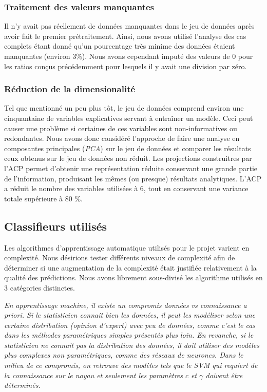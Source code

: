 \subsubsection{Traitement des valeurs manquantes}
Il n'y avait pas réellement de données manquantes dans le jeu de données après avoir fait le premier prétraitement. Ainsi, nous avons utilisé l'analyse des cas complets étant donné qu'un pourcentage très minime des données étaient manquantes (environ 3\%). Nous avons cependant imputé des valeurs de 0 pour les ratios conçus précédemment pour lesquels il y avait une division par zéro.

\subsubsection{Réduction de la dimensionalité}
Tel que mentionné un peu plus tôt, le jeu de données comprend environ une cinquantaine de variables explicatives servant à entraîner un modèle. Ceci peut causer une problème si certaines de ces variables sont non-informatives ou redondantes. Nous avons donc considéré l'approche de faire une analyse en composantes principales (\textit{PCA}) sur le jeu de données et comparer les résultats ceux obtenus sur le jeu de données non réduit. Les projections construitres par l'ACP permet d'obtenir une représentation réduite conservant une grande partie de l'information, produisant les mêmes (ou presque) résultats analytiques. L'ACP a réduit le nombre des variables utilisées à 6, tout en conservant une variance totale supérieure à 80 \%.

\subsection{Classifieurs utilisés}
Les algorithmes d'apprentissage automatique utilisés pour le projet varient en complexité. Nous désirions tester différents niveaux de complexité afin de déterminer si une augmentation de la complexité était justifiée relativement à la qualité des prédictions. Nous avons librement sous-divisé les algorithme utilisés en 3 catégories distinctes.

\textit{En apprentissage machine, il existe un compromis données vs connaissance a priori. Si le statisticien connait bien les données, il peut les modéliser selon une certaine distribution (opinion d'expert) avec peu de données, comme c'est le cas dans les méthodes paramétriques simples présentés plus loin. En revanche, si le statisticien ne connait pas la distribution des données, il doit utiliser des modèles plus complexes non paramétriques, comme des réseaux de neurones. Dans le milieu de ce compromis, on retrouve des modèles tels que le SVM qui requiert de la connaissance sur le noyau et seulement les paramètres $c$ et $\gamma$ doivent être déterminés.}

